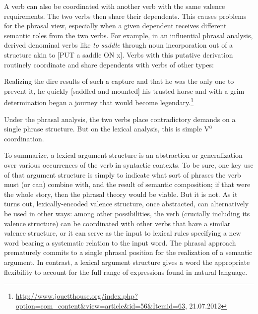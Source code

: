 \documentclass[output=paper
	        ,collection
	        ,collectionchapter
 	        ,biblatex
                ,babelshorthands
                ,newtxmath
                ,draftmode
                ,colorlinks, citecolor=brown
]{langscibook}
\begin{document}
A verb can also be coordinated with another verb with the same valence requirements.  The two verbs then share their dependents.  This causes problems for the phrasal view, especially when a given dependent receives different semantic roles from the two verbs.  For example, in an influential phrasal analysis, \citet{hale+keyser:1993}
derived denominal verbs like \textit{to saddle} through noun incorporation out of a structure akin to
[PUT a saddle ON x].  Verbs with this putative derivation routinely coordinate and share
dependents with verbs of other types: 

\begin{exe}
\ex Realizing the dire results of such a capture and that he was the only one to prevent it, he quickly
[saddled and mounted] his trusted horse and with a grim determination began a journey that would
become legendary.\footnote{\url{http://www.jouetthouse.org/index.php?option=com_content&view=article&id=56&Itemid=63},
  21.07.2012}  
\end{exe}

\noindent
Under the phrasal analysis, the two verbs place contradictory demands on a single phrase structure.  But on the lexical analysis, this is simple V$^0$ coordination.   
 
To summarize, a lexical argument structure is an abstraction or generalization over various occurrences of the verb in syntactic contexts. To be sure, one key use of that argument structure is simply to indicate what sort of phrases the verb must (or can) combine with, and the result of semantic composition; if that were the whole story, then the phrasal theory would be viable. But it is not. As it turns out, lexically-encoded valence structure, once abstracted, can alternatively be used in other ways: among other possibilities, the verb (crucially including its valence structure) can be coordinated with other verbs that have a similar valence structure, or it can serve as the input to lexical rules specifying a new word bearing a systematic relation to the input word.   The phrasal approach prematurely commits to a single phrasal position for the realization of 
a semantic argument.  In contrast, a lexical argument structure gives a word the appropriate flexibility to account for the full range of expressions found in natural language.   
 


%
{\sloppy
\printbibliography[heading=subbibliography,notkeyword=this] 
}
\end{document}
